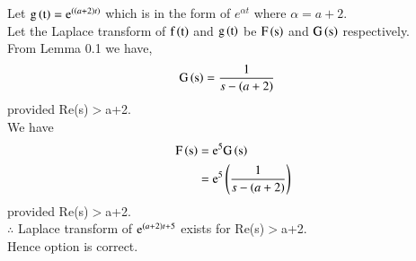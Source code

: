 \documentclass[journal,12pt,twocolumn]{IEEEtran}
\begin{document}
Let $\text{g}\left(\text{t}\right) = \text{e}^{\left(\left(a+2\right)t\right)} $ which is in the form of $e^{\alpha t}$ where $ \alpha = a+2$.\\
Let the Laplace transform of $\text{f}\left(\text{t}\right)$ and $\text{g}\left(\text{t}\right)$ be $\text{F}\left(\text{s}\right)$ and $\text{G}\left(\text{s}\right)$ respectively.\\
From Lemma 0.1 we have,
\begin{align}
\label{eq:3}
\text{G}\left(\text{s}\right)={}&\frac{1}{s-\left(a+2\right)}
\end{align}
provided Re(s)$>$a+2.\\
We have
\begin{align}
\label{eq:4}
\text{F}\left(\text{s}\right)={}&\text{e}^5 \text{G}\left(\text{s}\right)\\
\label{eq:5}
={}&\text{e}^5\left(\frac{1}{s-\left(a+2\right)}\right)
\end{align}
provided Re(s)$>$a+2.\\
$\therefore$ Laplace transform of $\text{e}^{\left(a+2\right)t+5}$ exists for Re(s)$>$a+2.\\
Hence option  is correct.
\end{document}
